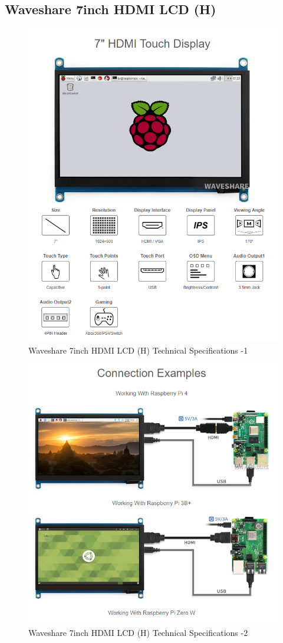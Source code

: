\subsection{Waveshare 7inch HDMI LCD (H)}

\begin{figure}[H]
    \centering
    \includegraphics[width=0.85\linewidth]{texs/appendix/data/techspecs/screen1.png}
    \caption{Waveshare 7inch HDMI LCD (H) Technical Specifications -1 }
    \label{fig:lcd-1}
\end{figure}

\begin{figure}[H]
    \centering
    \includegraphics[width=0.85\linewidth]{texs/appendix/data/techspecs/screen2.png}
    \caption{Waveshare 7inch HDMI LCD (H) Technical Specifications -2 }
    \label{fig:lcd-2}
\end{figure}

